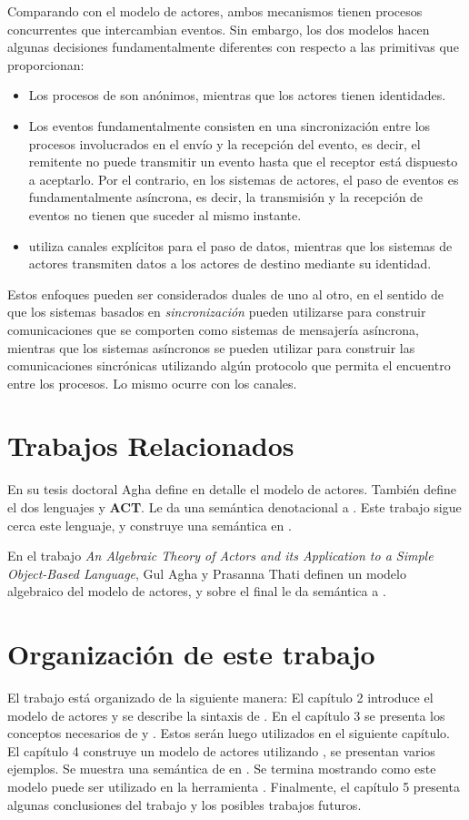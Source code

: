 Comparando \CSP con el modelo de actores, ambos mecanismos tienen procesos concurrentes que intercambian eventos. Sin embargo, los dos modelos hacen algunas decisiones fundamentalmente diferentes con respecto a las primitivas que proporcionan:

\begin{itemize}
\item Los procesos de \CSP son anónimos, mientras que los actores tienen identidades.
\item Los eventos fundamentalmente consisten en una sincronización entre los procesos involucrados en el envío y la recepción del evento, es decir, el remitente no puede transmitir un evento hasta que el receptor está dispuesto a aceptarlo. Por el contrario, en los sistemas de actores, el paso de eventos es fundamentalmente asíncrona, es decir, la transmisión y la recepción de eventos no tienen que suceder al mismo instante.
\item \CSP utiliza canales explícitos para el paso de datos, mientras que los sistemas de actores transmiten datos a los actores de destino mediante su identidad.
\end{itemize}

Estos enfoques pueden ser considerados duales de uno al otro, en el sentido de que los sistemas basados en \emph{sincronización} pueden utilizarse para construir comunicaciones que se comporten como sistemas de mensajería asíncrona, mientras que los sistemas asíncronos se pueden utilizar para construir las comunicaciones sincrónicas utilizando algún protocolo que permita el encuentro entre los procesos. Lo mismo ocurre con los canales.

\section{Trabajos Relacionados}

En su tesis doctoral Agha\cite{Agha:1986:AMC:7929} define en detalle el modelo de actores. También define el dos lenguajes \SAL y \textbf{ACT}. Le da una semántica denotacional a \SAL. Este trabajo sigue cerca este lenguaje, y construye una semántica en \CSP.

En el trabajo \textit{An Algebraic Theory of Actors and its Application to a Simple Object-Based Language}\cite{apicalculus}, Gul Agha y Prasanna Thati definen un modelo algebraico del modelo de actores, y sobre el final le da semántica a \SAL.

\section{Organización de este trabajo}

El trabajo está organizado de la siguiente manera: El capítulo 2 introduce el modelo de actores y se describe la sintaxis de \SAL. En el capítulo 3 se presenta los conceptos necesarios de \CSP y \CSPm. Estos serán luego utilizados en el siguiente capítulo. El capítulo 4 construye un modelo de actores utilizando \CSP, se presentan varios ejemplos. Se muestra una semántica de \SAL en \CSP. Se termina mostrando como este modelo puede ser utilizado en la herramienta \FDR. Finalmente, el capítulo 5 presenta algunas conclusiones del trabajo y los posibles trabajos futuros.

